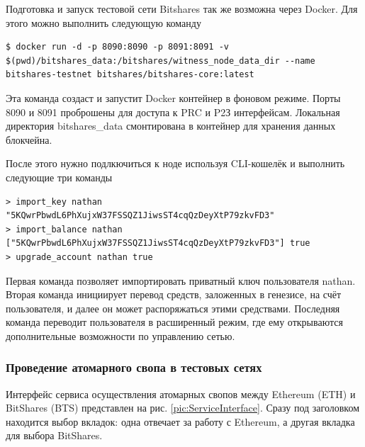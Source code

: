 Подготовка и запуск тестовой сети Bitshares так же возможна через Docker. Для этого можно выполнить следующую команду

\begin{lstlisting}[style=CommandLineStyle, belowskip=-2 \baselineskip]
$ docker run -d -p 8090:8090 -p 8091:8091 -v $(pwd)/bitshares_data:/bitshares/witness_node_data_dir --name bitshares-testnet bitshares/bitshares-core:latest
\end{lstlisting}

Эта команда создаст и запустит Docker контейнер в фоновом режиме. Порты 8090 и 8091 проброшены для доступа к PRC и P2З интерфейсам. Локальная директория bitshares\_data смонтирована в контейнер для хранения данных блокчейна.

После этого нужно подлкючиться к ноде используя CLI-кошелёк и выполнить следующие три команды

\begin{lstlisting}[style=CommandLineStyle, belowskip=-2 \baselineskip]
> import_key nathan "5KQwrPbwdL6PhXujxW37FSSQZ1JiwsST4cqQzDeyXtP79zkvFD3"
> import_balance nathan ["5KQwrPbwdL6PhXujxW37FSSQZ1JiwsST4cqQzDeyXtP79zkvFD3"] true
> upgrade_account nathan true
\end{lstlisting}

Первая команда позволяет импортировать приватный ключ пользователя nathan. Вторая команда инициирует перевод средств, заложенных в генезисе, на счёт пользователя, и далее он может распоряжаться этими средствами. Последняя команда переводит пользователя в расширенный режим, где ему открываются дополнительные возможности по управлению сетью.

\subsubsection{Проведение атомарного свопа в тестовых сетях}

Интерфейс сервиса осуществления атомарных свопов между Ethereum (ETH) и BitShares (BTS) представлен на рис. \ref{pic:ServiceInterface}. Сразу под заголовком находится выбор вкладок: одна отвечает за работу с  Ethereum, а другая вкладка для выбора BitShares.

